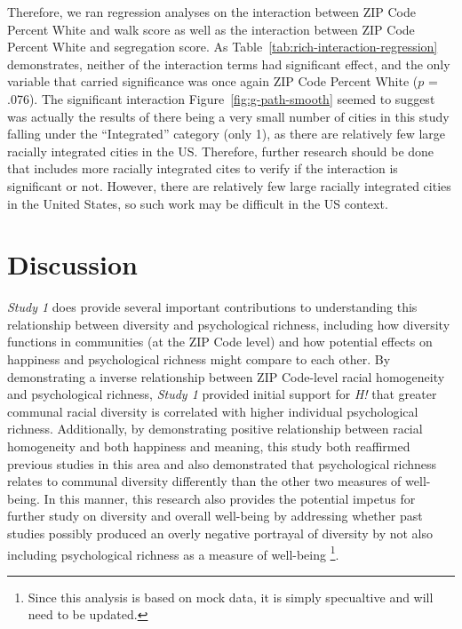 \documentclass[
  man,floatsintext]{apa7}
\begin{document}
Therefore, we ran regression analyses on the interaction between ZIP Code Percent White and walk score as well as the interaction between ZIP Code Percent White and segregation score. As Table~\ref{tab:rich-interaction-regression} demonstrates, neither of the interaction terms had significant effect, and the only variable that carried significance was once again ZIP Code Percent White (\(p\) = .076). The significant interaction Figure~\ref{fig:g-path-smooth} seemed to suggest was actually the results of there being a very small number of cities in this study falling under the ``Integrated'' category (only 1), as there are relatively few large racially integrated cities in the US. Therefore, further research should be done that includes more racially integrated cites to verify if the interaction is significant or not. However, there are relatively few large racially integrated cities in the United States, so such work may be difficult in the US context.

\hypertarget{discussion}{%
\section{Discussion}\label{discussion}}

\emph{Study 1} does provide several important contributions to understanding this relationship between diversity and psychological richness, including how diversity functions in communities (at the ZIP Code level) and how potential effects on happiness and psychological richness might compare to each other. By demonstrating a inverse relationship between ZIP Code-level racial homogeneity and psychological richness, \emph{Study 1} provided initial support for \emph{H!} that greater communal racial diversity is correlated with higher individual psychological richness. Additionally, by demonstrating positive relationship between racial homogeneity and both happiness and meaning, this study both reaffirmed previous studies in this area and also demonstrated that psychological richness relates to communal diversity differently than the other two measures of well-being. In this manner, this research also provides the potential impetus for further study on diversity and overall well-being by addressing whether past studies possibly produced an overly negative portrayal of diversity by not also including psychological richness as a measure of well-being \footnote{Since this analysis is based on mock data, it is simply specualtive and will need to be updated.}.
\end{document}
